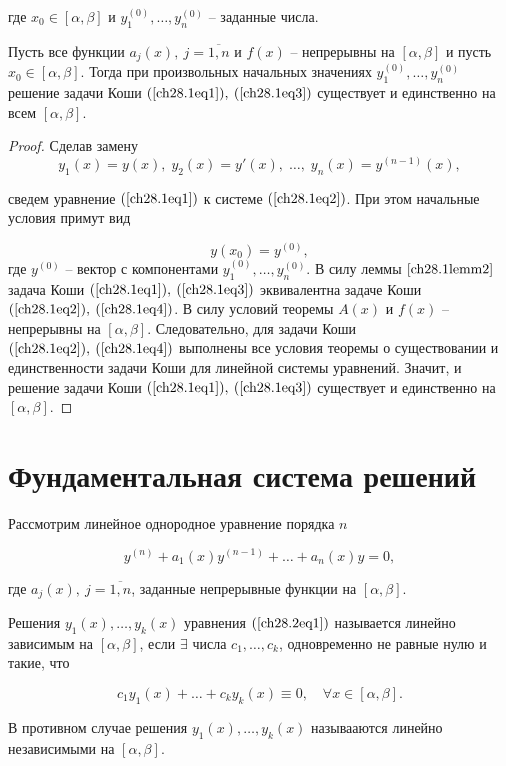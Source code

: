 где $x_0 \in [\alpha, \beta]$ и $y_1^{(0)}, \ldots, y_n^{(0)}$ -- заданные числа.

\begin{thm}
Пусть все функции $a_j(x), \: j = \overline{1,n}$ и $f(x)$ -- непрерывны на $[\alpha, \beta]$ и пусть $x_0 \in [\alpha, \beta]$. Тогда при произвольных начальных значениях $y_1^{(0)}, \ldots, y_n^{(0)}$ решение задачи Коши $(\ref{ch28.1eq1}), \: (\ref{ch28.1eq3})$ существует и единственно на всем $[\alpha, \beta]$.
\end{thm}

\begin{proof}
Сделав замену 
$$
y_1(x) = y(x), \; y_2(x) = y'(x), \; \ldots, \; y_n(x) = y^{(n - 1)}(x),
$$

сведем уравнение $(\ref{ch28.1eq1})$ к системе $(\ref{ch28.1eq2})$. При этом начальные условия примут вид

\begin{equation} \label{ch28.1eq4}
y(x_0) = y^{(0)},
\end{equation}
где $y^{(0)}$ -- вектор с компонентами $y_1^{(0)}, \ldots, y_n^{(0)}$. В силу леммы $\ref{ch28.1lemm2}$ задача Коши $(\ref{ch28.1eq1}), \: (\ref{ch28.1eq3})$ эквивалентна задаче Коши $(\ref{ch28.1eq2}), \: (\ref{ch28.1eq4})$. В силу условий теоремы $A(x)$ и $f(x)$ -- непрерывны на $[\alpha, \beta]$. Следовательно, для задачи Коши $(\ref{ch28.1eq2}), \: (\ref{ch28.1eq4})$ выполнены все условия теоремы о существовании и единственности задачи Коши для линейной системы уравнений. Значит, и решение задачи Коши $(\ref{ch28.1eq1}), \: (\ref{ch28.1eq3})$ существует и единственно на $[\alpha, \beta]$.
\end{proof}
\section{Фундаментальная система решений}

Рассмотрим линейное однородное уравнение порядка $n$

\begin{equation} \label{ch28.2eq1}
y^{(n)} + a_1(x)y^{(n - 1)} + \ldots + a_n(x)y = 0,
\end{equation} 

где $a_j(x), \: j = \overline{1,n}$, заданные непрерывные функции на $[\alpha, \beta]$.

\begin{defn}
Решения $y_1(x), \ldots, y_k(x)$ уравнения $(\ref{ch28.2eq1})$ называется линейно зависимым на $[\alpha, \beta]$, если $\exists$ числа $c_1, \ldots, c_k$, одновременно не равные нулю и такие, что 

$$
c_1y_1(x) + \ldots + c_ky_k(x) \equiv 0, \quad \forall x \in [\alpha, \beta].
$$

В противном случае решения $y_1(x), \ldots, y_k(x)$ называаются линейно независимыми на $[\alpha, \beta]$.
\end{defn}

